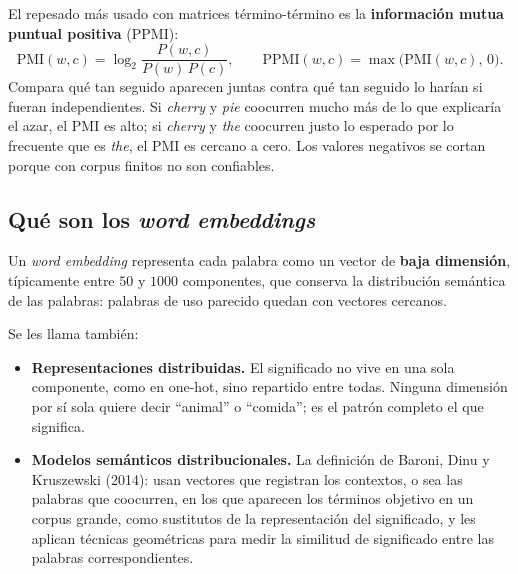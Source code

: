 \documentclass[11pt,letterpaper]{article}
\begin{document}
\begin{idea}
    El repesado más usado con matrices término-término es la
    \textbf{información mutua puntual positiva} (PPMI):
    \[
        \mathrm{PMI}(w, c) = \log_2 \frac{P(w, c)}{P(w)\,P(c)} ,
        \qquad
        \mathrm{PPMI}(w, c) = \max\big(\mathrm{PMI}(w, c),\, 0\big) .
    \]
    Compara qué tan seguido aparecen juntas contra qué tan seguido lo
    harían si fueran independientes. Si \textit{cherry} y \textit{pie}
    coocurren mucho más de lo que explicaría el azar, el PMI es alto;
    si \textit{cherry} y \textit{the} coocurren justo lo esperado por
    lo frecuente que es \textit{the}, el PMI es cercano a cero. Los
    valores negativos se cortan porque con corpus finitos no son
    confiables.
\end{idea}


\subsection*{Qué son los \textit{word embeddings}}

\begin{definicion}
    Un \textit{word embedding} representa cada palabra como un vector
    de \textbf{baja dimensión}, típicamente entre $50$ y $1000$
    componentes, que conserva la distribución semántica de las
    palabras: palabras de uso parecido quedan con vectores cercanos.
\end{definicion}

Se les llama también:

\begin{itemize}[itemsep=0.3em]
    \item \textbf{Representaciones distribuidas.} El significado no
          vive en una sola componente, como en one-hot, sino repartido
          entre todas. Ninguna dimensión por sí sola quiere decir
          ``animal'' o ``comida''; es el patrón completo el que
          significa.
    \item \textbf{Modelos semánticos distribucionales.} La definición
          de Baroni, Dinu y Kruszewski (2014): usan vectores que
          registran los contextos, o sea las palabras que coocurren, en
          los que aparecen los términos objetivo en un corpus grande,
          como sustitutos de la representación del significado, y les
          aplican técnicas geométricas para medir la similitud de
          significado entre las palabras correspondientes.
\end{itemize}
\end{document}
